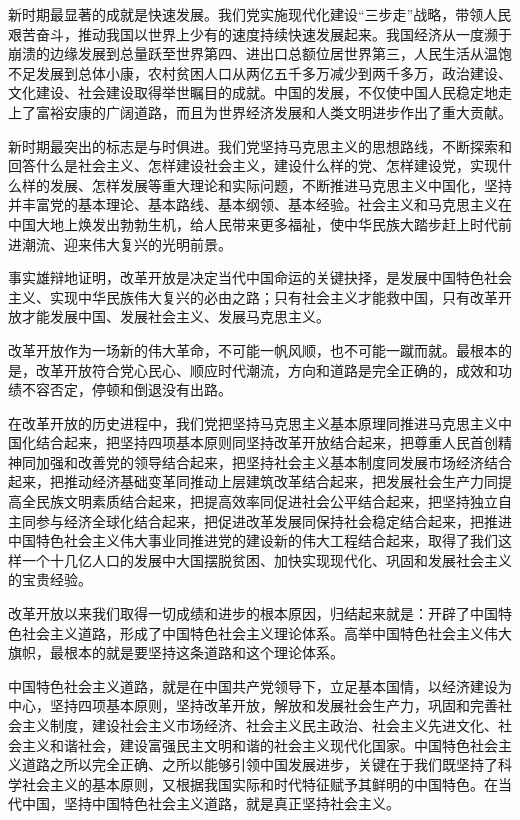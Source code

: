 新时期最显著的成就是快速发展。我们党实施现代化建设“三步走”战略，带领人民艰苦奋斗，推动我国以世界上少有的速度持续快速发展起来。我国经济从一度濒于崩溃的边缘发展到总量跃至世界第四、进出口总额位居世界第三，人民生活从温饱不足发展到总体小康，农村贫困人口从两亿五千多万减少到两千多万，政治建设、文化建设、社会建设取得举世瞩目的成就。中国的发展，不仅使中国人民稳定地走上了富裕安康的广阔道路，而且为世界经济发展和人类文明进步作出了重大贡献。

新时期最突出的标志是与时俱进。我们党坚持马克思主义的思想路线，不断探索和回答什么是社会主义、怎样建设社会主义，建设什么样的党、怎样建设党，实现什么样的发展、怎样发展等重大理论和实际问题，不断推进马克思主义中国化，坚持并丰富党的基本理论、基本路线、基本纲领、基本经验。社会主义和马克思主义在中国大地上焕发出勃勃生机，给人民带来更多福祉，使中华民族大踏步赶上时代前进潮流、迎来伟大复兴的光明前景。

事实雄辩地证明，改革开放是决定当代中国命运的关键抉择，是发展中国特色社会主义、实现中华民族伟大复兴的必由之路；只有社会主义才能救中国，只有改革开放才能发展中国、发展社会主义、发展马克思主义。

改革开放作为一场新的伟大革命，不可能一帆风顺，也不可能一蹴而就。最根本的是，改革开放符合党心民心、顺应时代潮流，方向和道路是完全正确的，成效和功绩不容否定，停顿和倒退没有出路。

在改革开放的历史进程中，我们党把坚持马克思主义基本原理同推进马克思主义中国化结合起来，把坚持四项基本原则同坚持改革开放结合起来，把尊重人民首创精神同加强和改善党的领导结合起来，把坚持社会主义基本制度同发展市场经济结合起来，把推动经济基础变革同推动上层建筑改革结合起来，把发展社会生产力同提高全民族文明素质结合起来，把提高效率同促进社会公平结合起来，把坚持独立自主同参与经济全球化结合起来，把促进改革发展同保持社会稳定结合起来，把推进中国特色社会主义伟大事业同推进党的建设新的伟大工程结合起来，取得了我们这样一个十几亿人口的发展中大国摆脱贫困、加快实现现代化、巩固和发展社会主义的宝贵经验。

改革开放以来我们取得一切成绩和进步的根本原因，归结起来就是：开辟了中国特色社会主义道路，形成了中国特色社会主义理论体系。高举中国特色社会主义伟大旗帜，最根本的就是要坚持这条道路和这个理论体系。

中国特色社会主义道路，就是在中国共产党领导下，立足基本国情，以经济建设为中心，坚持四项基本原则，坚持改革开放，解放和发展社会生产力，巩固和完善社会主义制度，建设社会主义市场经济、社会主义民主政治、社会主义先进文化、社会主义和谐社会，建设富强民主文明和谐的社会主义现代化国家。中国特色社会主义道路之所以完全正确、之所以能够引领中国发展进步，关键在于我们既坚持了科学社会主义的基本原则，又根据我国实际和时代特征赋予其鲜明的中国特色。在当代中国，坚持中国特色社会主义道路，就是真正坚持社会主义。

